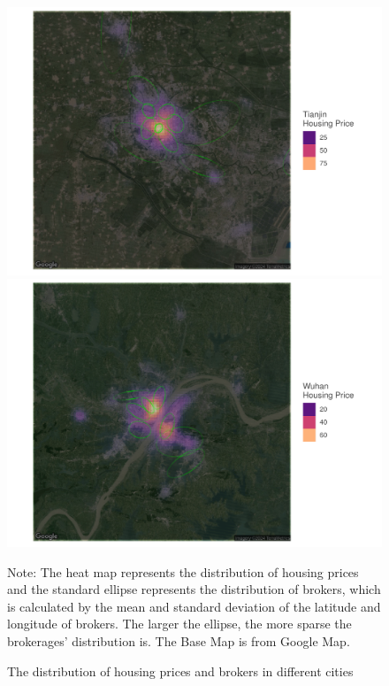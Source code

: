 \begin{figure}[h!]
\begin{minipage}{0.328\textwidth}
        \includegraphics[width=\linewidth]{../figures/distribution_of_hp_and_broker/Tianjin.pdf}
    \end{minipage}

    \begin{minipage}{0.328\textwidth}
        \includegraphics[width=\linewidth]{../figures/distribution_of_hp_and_broker/Wuhan.pdf}
    \end{minipage}
    \hfill

\caption{The distribution of housing prices and brokers in different cities}
\label{fig:distribution_of_housing_price_brokers_in_different_cities}

Note: The heat map represents the distribution of housing prices and the standard ellipse represents the distribution of brokers, which is calculated by the mean and standard deviation of the latitude and longitude of brokers. The larger the ellipse, the more sparse the brokerages' distribution is. The Base Map is from Google Map.
 \end{figure}
